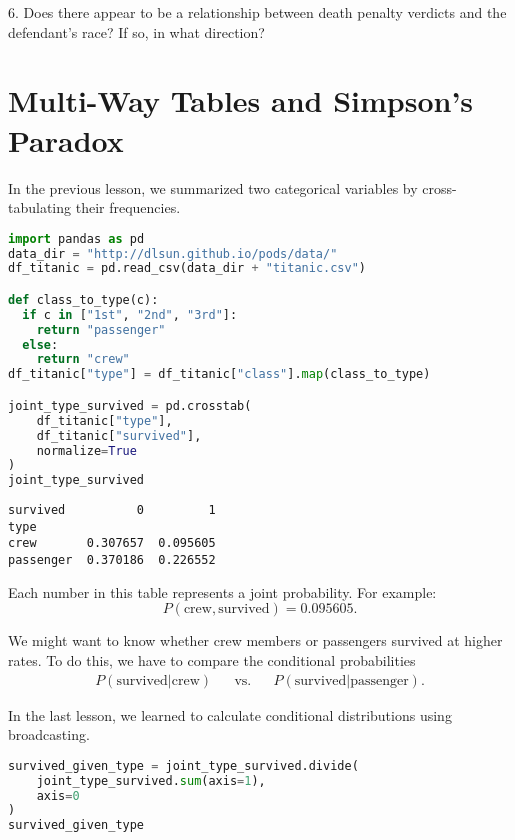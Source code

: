 6. Does there appear to be a relationship between death penalty verdicts and the defendant's race? If so, in what direction?






\section{Multi-Way Tables and Simpson's Paradox}\label{2.3}



In the previous lesson, we summarized two categorical variables by cross-tabulating their frequencies.

\begin{lstlisting}[language=Python]
import pandas as pd
data_dir = "http://dlsun.github.io/pods/data/"
df_titanic = pd.read_csv(data_dir + "titanic.csv")

def class_to_type(c):
  if c in ["1st", "2nd", "3rd"]:
    return "passenger"
  else:
    return "crew"
df_titanic["type"] = df_titanic["class"].map(class_to_type)

joint_type_survived = pd.crosstab(
    df_titanic["type"],
    df_titanic["survived"],
    normalize=True
)
joint_type_survived
\end{lstlisting}

\small\begin{verbatim}
survived          0         1
type                         
crew       0.307657  0.095605
passenger  0.370186  0.226552
\end{verbatim}



Each number in this table represents a joint probability. For example:
$$ P(\text{crew}, \text{survived}) = 0.095605. $$

We might want to know whether crew members or passengers survived at higher rates. To do this, we have to compare the conditional probabilities
\begin{align}
P(\text{survived} | \text{crew}) & & \text{vs.} & & P(\text{survived} | \text{passenger}).\end{align}

In the last lesson, we learned to calculate conditional distributions using broadcasting.

\begin{lstlisting}[language=Python]
survived_given_type = joint_type_survived.divide(
    joint_type_survived.sum(axis=1),
    axis=0
)
survived_given_type
\end{lstlisting}

